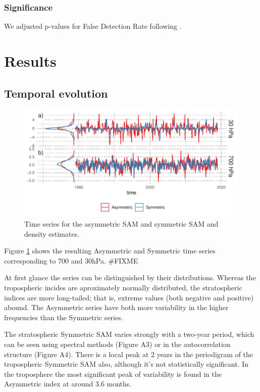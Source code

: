 \documentclass[]{ametsocV5}
\begin{document}
\subsubsection{Significance}

We adjusted p-values for False Detection Rate following
\citet{wilks2016}.

\section{Results}

\subsection{Temporal evolution}

\begin{figure}
\includegraphics{asymsam-timeseries-1} \caption[Time series for the asymmetric SAM and symmetric SAM and density estimates]{Time series for the asymmetric SAM and symmetric SAM and density estimates.}\label{fig:asymsam-timeseries}
\end{figure}

Figure \ref{fig:asymsam-timeseries} shows the resulting Asymmetric and
Symmetric time series corresponding to 700 and 30hPa. \#FIXME

At first glance the series can be distinguished by their distributions.
Whereas the tropospheric incides are aproximately normally distributed,
the stratospheric indices are more long-tailed; that is, extreme values
(both negative and positive) abound. The Asymmetric series have both
more variability in the higher frequencies than the Symmetric series.

The stratospheric Symmetric SAM varies strongly with a two-year period,
which can be seen using spectral methods (Figure A3) or in the
autocorrelation structure (Figure A4). There is a local peak at 2 years
in the periodigram of the tropospheric Symmetric SAM also, although it's
not statistically significant. In the troposphere the most significant
peak of variability is found in the Asymmetric index at around 3.6
months.
\end{document}
